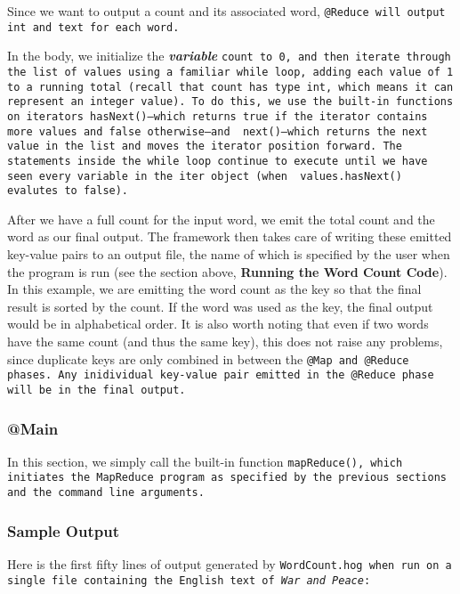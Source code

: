 \documentclass{article} \usepackage{fancyhdr, multicol}
\begin{document}
Since we want to output a count and its associated word, \tt @Reduce \rm will
output \tt int \rm and \tt text \rm for each word.

In the body, we initialize the \textbf{\emph{variable}} \tt count \rm to \tt 0\rm,
and then iterate through the list of values using a familiar \tt while \rm loop,
adding each value of \tt 1 \rm to a running total (recall that \tt count \rm has
type \tt int\rm, which means it can represent an integer value). To do this, we use
the built-in functions on iterators \tt hasNext()\rm---which returns \tt true \rm
if the iterator contains more values and \tt false \rm otherwise---and \tt
next()\rm---which returns the next value in the \tt list \rm and moves the
iterator position forward. The statements inside the \tt while \rm loop continue to
execute until we have seen every variable in the \tt iter \rm object (when \tt
values.hasNext() \rm evalutes to \tt false\rm).

After we have a full count for the input word, we emit the total count and the word
as our final output. The framework then takes care of writing these emitted
key-value pairs to an output file, the name of which is specified by the user when
the program is run (see the section above, \textbf{Running the Word Count Code}). In this example, we are emitting the word count as the key so that the final result is sorted by the count. If the word was used as the key, the final output would be in alphabetical order. It is also worth noting that even if two words have the same count (and thus the same key), this does not raise any problems, since duplicate keys are only combined in between the \tt @Map \rm and \tt @Reduce \rm phases. Any inidividual key-value pair emitted in the \tt @Reduce \rm phase will be in the final output.

\subsubsection*{@Main}

In this section, we simply call the built-in function \tt mapReduce()\rm, which
initiates the MapReduce program as specified by the previous sections and the
command line arguments.

\subsubsection*{Sample Output}

Here is the first fifty lines of output generated by \tt WordCount.hog \rm when run
on a single file containing the English text of \emph{War and Peace}:
\end{document}
